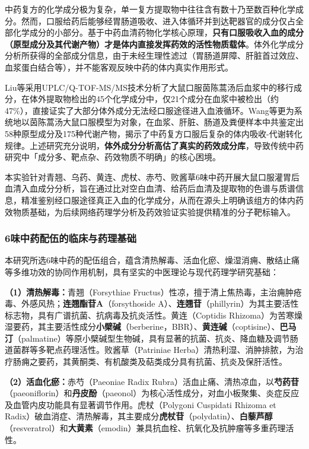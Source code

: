\documentclass[12pt,a4paper,UTF8,scheme=chinese]{ctexart}
\newcommand{\compoundname}[1]{\textbf{#1}}
\newcommand{\keyterm}[1]{\textbf{#1}}
\begin{document}
中药复方的化学成分极为复杂，单一复方提取物中往往含有数十乃至数百种化学成分。然而，口服给药后能够经胃肠道吸收、进入体循环并到达靶器官的成分仅占全部化学成分的小部分。基于中药血清药物化学核心原理，\keyterm{只有口服吸收入血的成分（原型成分及其代谢产物）才是体内直接发挥药效的活性物质载体}\cite{Wang2016}。体外化学成分分析所获得的全部成分信息，由于未经生理性滤过（胃肠道屏障、肝脏首过效应、血浆蛋白结合等），并不能客观反映中药的体内真实作用形式。

Liu等\cite{Liu2008}采用UPLC/Q-TOF-MS/MS技术分析了大鼠口服茵陈蒿汤后血浆中的移行成分，在体外提取物检出的45个化学成分中，仅21个成分在血浆中被检出（约47\%），直接证实了大部分体外成分无法经口服途径进入血液循环。Wang等\cite{WangY2023}更为系统地以茵陈蒿汤大鼠口服模型为对象，在血浆、肝脏、肠道及粪便样本中共鉴定出58种原型成分及175种代谢产物，揭示了中药复方口服后复杂的体内吸收-代谢转化规律。上述研究充分说明，\keyterm{体外成分分析高估了真实的药效成分库}，导致传统中药研究中「成分多、靶点杂、药效物质不明确」的核心困境。

本实验针对青翘、乌药、黄连、虎杖、赤芍、败酱草6味中药开展大鼠口服灌胃后血清入血成分分析，旨在通过比对空白血清、给药后血清及提取物的色谱与质谱信息，精准鉴别经口服途径真正入血的化学成分，从而在源头上明确该组方的体内药效物质基础，为后续网络药理学分析及药效验证实验提供精准的分子靶标输入。

\subsubsection{6味中药配伍的临床与药理基础}

本研究所选6味中药的配伍组合，蕴含清热解毒、活血化瘀、燥湿消痈、散结止痛等多维功效的协同作用机制，具有坚实的中医理论与现代药理学研究基础：

\textbf{（1）清热解毒：}青翘（Forsythiae Fructus）性凉，擅于清上焦热毒，主治痈肿疮毒、外感风热；\compoundname{连翘酯苷A}（forsythoside A）、\compoundname{连翘苷}（phillyrin）为其主要活性标志物，具有广谱抗菌、抗病毒及抗炎活性\cite{Review2021FA}。黄连（Coptidis Rhizoma）为苦寒燥湿要药，其主要活性成分\compoundname{小檗碱}（berberine，BBR）、\compoundname{黄连碱}（coptisine）、\compoundname{巴马汀}（palmatine）等原小檗碱型生物碱，具有显著的抗菌、抗炎、降血糖及调节肠道菌群等多靶点药理活性\cite{FengX2021}。败酱草（Patriniae Herba）清热利湿、消肿排脓，为治疗肠痈之要药，其黄酮类、有机酸类及萜类成分具有抗菌、抗炎及保肝活性\cite{Gong2021}。

\textbf{（2）活血化瘀：}赤芍（Paeoniae Radix Rubra）活血止痛、清热凉血，以\compoundname{芍药苷}（paeoniflorin）和\compoundname{丹皮酚}（paeonol）为核心活性成分，对血小板聚集、炎症反应及血管内皮功能具有显著调节作用\cite{Hu2020}。虎杖（Polygoni Cuspidati Rhizoma et Radix）破血消症、清热解毒，其主要成分\compoundname{虎杖苷}（polydatin）、\compoundname{白藜芦醇}（resveratrol）和\compoundname{大黄素}（emodin）兼具抗血栓、抗氧化及抗肿瘤等多重药理活性\cite{Yang2024}。
\end{document}
